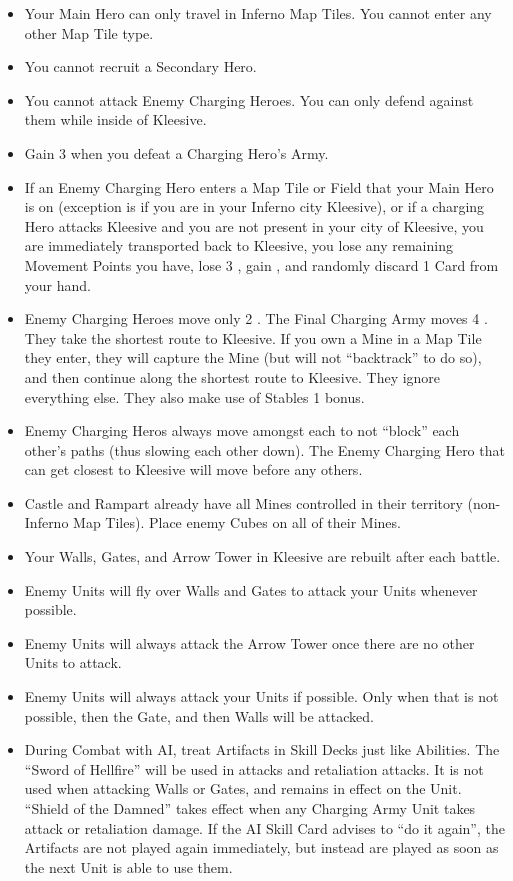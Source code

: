 \begin{multicols}{2}
\begin{itemize}
  \item Your Main Hero can only travel in Inferno Map Tiles. You cannot enter any other Map Tile type.
  \item You cannot recruit a Secondary Hero.
  \item You cannot attack Enemy Charging Heroes. You can only defend against them while inside of Kleesive.
  \item Gain 3  when you defeat a Charging Hero's Army.
  \item If an Enemy Charging Hero enters a Map Tile or Field that your Main Hero is on (exception is if you are in
    your Inferno city Kleesive), or if a charging Hero attacks Kleesive and you are not present in your city
    of Kleesive, you are immediately transported back to Kleesive, you lose any remaining Movement Points
    you have, lose 3 , gain , and randomly discard 1 Card from your hand.
  \item Enemy Charging Heroes move only 2 . The Final Charging Army moves 4 . They take the shortest
    route to Kleesive. If you own a Mine in a Map Tile they enter, they will capture the Mine (but will not
    ``backtrack'' to do so), and then continue along the shortest route to Kleesive. They ignore everything
    else. They also make use of Stables 1  bonus.
  \item Enemy Charging Heros always move amongst each to not ``block'' each other's paths (thus slowing each
    other down). The Enemy Charging Hero that can get closest to Kleesive will move before any others.
  \item Castle and Rampart already have all Mines controlled in their territory (non-Inferno Map Tiles). Place enemy
    Cubes on all of their Mines.
  \item Your Walls, Gates, and Arrow Tower in Kleesive are rebuilt after each battle.
  \item Enemy  Units will fly over Walls and Gates to attack your Units whenever possible.
  \item Enemy  Units will always attack the Arrow Tower once there are no other  Units to attack.
  \item Enemy Units will always attack your Units if possible. Only when that is not possible, then the Gate,
    and then Walls will be attacked.
  \item During Combat with AI, treat Artifacts in Skill Decks just like Abilities.
    The ``Sword of Hellfire'' will be used in attacks and retaliation attacks.
    It is not used when attacking Walls or Gates, and remains in effect on the Unit.
    ``Shield of the Damned'' takes effect when any Charging Army Unit takes attack or retaliation damage.
    If the AI Skill Card advises to ``do it again'', the Artifacts are not played again immediately, but instead are played as soon as the next Unit is able to use them.

\end{itemize}


\end{multicols}


